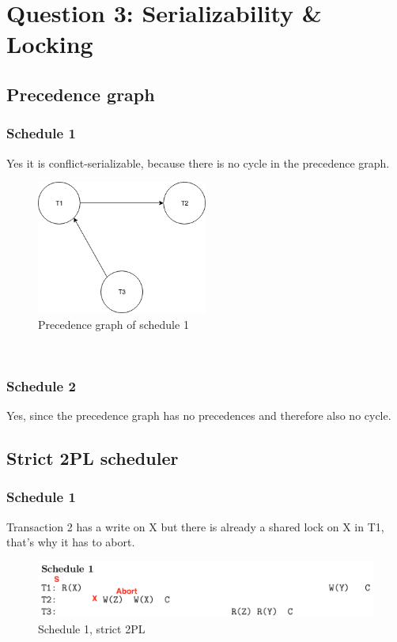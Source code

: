 \documentclass[12pt,a4paper]{article}
\begin{document}
\section{Question 3: Serializability \& Locking}

\subsection{Precedence graph}
\subsubsection{Schedule 1}
Yes it is conflict-serializable, because there is no cycle in the precedence graph.
\begin{figure}[!htb]
	\center
	\includegraphics[width=0.5\textwidth]{img/schedule1}
	\caption{Precedence graph of schedule 1}
\end{figure}\\
\subsubsection{Schedule 2}
Yes, since the precedence graph has no precedences and therefore also no cycle.

\subsection{Strict 2PL scheduler}

\subsubsection{Schedule 1}
Transaction 2 has a write on X but there is already a shared lock on X in T1, that's why it has to abort.
\begin{figure}[!htb]
	\center
	\includegraphics[width=\textwidth]{img/Schedule1_strict2PL}
	\caption{Schedule 1, strict 2PL}
\end{figure}
\end{document}
